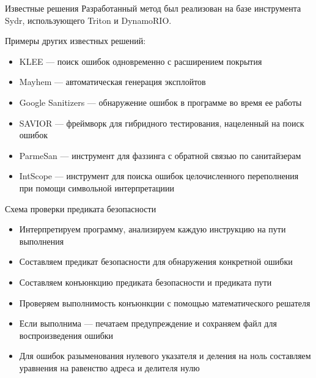 \documentclass[10pt]{beamer}
\begin{document}
\begin{frame}{Известные решения}
Разработанный метод был реализован на базе инструмента Sydr, использующего
Triton и DynamoRIO.

Примеры других известных решений:
\begin{itemize}
    \item KLEE --- поиск ошибок одновременно с расширением покрытия
    \item Mayhem --- автоматическая генерация эксплойтов
    \item Google Sanitizers --- обнаружение ошибок в программе
        во время ее работы
    \item SAVIOR --- фреймворк для гибридного тестирования, нацеленный на поиск
        ошибок
    \item ParmeSan --- инструмент для фаззинга с обратной связью по санитайзерам
    \item IntScope --- инструмент для поиска ошибок целочисленного переполнения
        при помощи символьной интерпретациии
\end{itemize}
\end{frame}

\begin{frame}{Схема проверки предиката безопасности}
\begin{itemize}
    \item Интерпретируем программу, анализируем каждую инструкцию на пути
        выполнения
    \item Составляем предикат безопасности для обнаружения конкретной ошибки
    \item Составляем конъюнкцию предиката безопасности и предиката пути
    \item Проверяем выполнимость конъюнкции с помощью математического решателя
    \item Если выполнима --- печатаем предупреждение и сохраняем файл
        для воспроизведения ошибки
    \item Для ошибок разыменования нулевого указателя и деления на ноль
        составляем уравнения на равенство адреса и делителя нулю
\end{itemize}
\end{frame}

\end{document}
